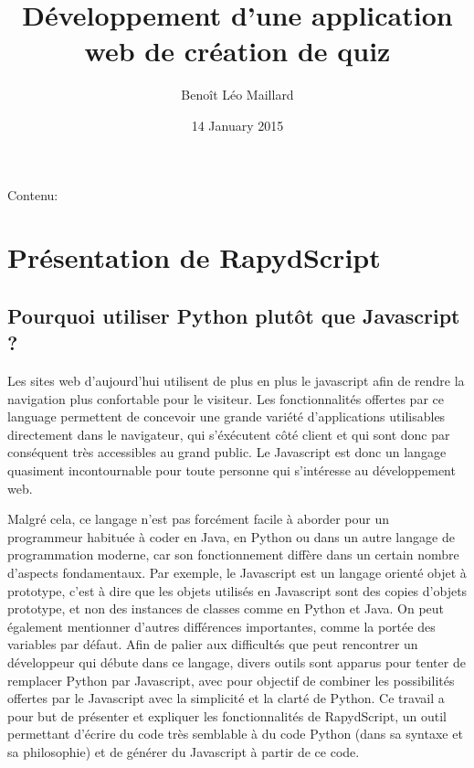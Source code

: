 \documentclass[letterpaper,10pt,french]{sphinxmanual}
\title{Développement d'une application web de création de quiz}
\date{14 January 2015}
\author{Benoît Léo Maillard}
\begin{document}
\maketitle
\tableofcontents
{}\label{index::doc}


Contenu:


\chapter{Présentation de RapydScript}
\label{rapydscript:developpement-d-une-application-web-de-creation-de-quiz-s-documentation}\label{rapydscript:presentation-de-rapydscript}\label{rapydscript::doc}

\section{Pourquoi utiliser Python plutôt que Javascript ?}
\label{rapydscript:pourquoi-utiliser-python-plutot-que-javascript}
Les sites web d'aujourd'hui utilisent de plus en plus le javascript afin de rendre la navigation plus confortable pour le visiteur. Les fonctionnalités offertes par ce language permettent de concevoir une grande variété d'applications utilisables directement dans le navigateur, qui s'éxécutent côté client et qui sont donc par conséquent très accessibles au grand public. Le Javascript est donc un langage quasiment incontournable pour toute personne qui s'intéresse au développement web.

Malgré cela, ce langage n'est pas forcément facile à aborder pour un programmeur habituée à coder en Java, en Python ou dans un autre langage de programmation moderne, car son fonctionnement diffère dans un certain nombre d'aspects fondamentaux. Par exemple, le Javascript est un langage orienté objet à prototype, c'est à dire que les objets utilisés en Javascript sont des copies d'objets prototype, et non des instances de classes comme en Python et Java. On peut également mentionner d'autres différences importantes, comme la portée des variables par défaut. Afin de palier aux difficultés que peut rencontrer un développeur qui débute dans ce langage, divers outils sont apparus pour tenter de remplacer Python par Javascript, avec pour objectif de combiner les possibilités offertes par le Javascript avec la simplicité et la clarté de Python. Ce travail a pour but de présenter et expliquer les fonctionnalités de RapydScript, un outil permettant d'écrire du code très semblable à du code Python (dans sa syntaxe et sa philosophie) et de générer du Javascript à partir de ce code.
\end{document}
